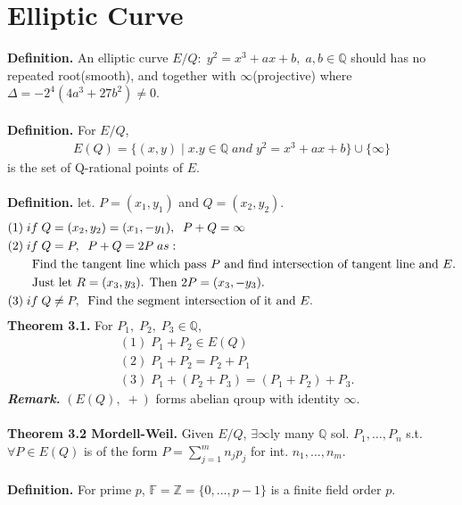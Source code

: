\documentclass[a4paper,10pt]{article}
\begin{document}
\section{Elliptic Curve}
\textbf{Definition.} An elliptic curve $E/Q: \; y^{2}=x^{3}+ax+b, \; a,b\in \mathbb{Q}$ should has no repeated root(smooth), and together with $\infty$(projective) where $\Delta=-2^{4}(4a^{3}+27b^{2})\neq 0$. \\ \\
\textbf{Definition.} For $E/Q$, 
\begin{align}
E(Q) = \{(x,y) \; | \; x.y \in \mathbb{Q} \; and \; y^{2}=x^{3}+ax+b\} \cup \{\infty\}
\end{align}
is the set of Q-rational points of $E$. \\ \\
\textbf{Definition.} let. $P=(x_{1}, y_{1})$ and $Q=(x_{2},y_{2})$.
\begin{align}
&(1) \; if \; Q=(x_{2},y_{2})=(x_{1},-y_{1}), \; \; P+Q=\infty \\
&(2) \; if \; Q=P, \; \; P+Q=2P \; as: \\
&\quad \quad \textnormal{Find the tangent line which pass $P$ and find intersection of tangent line and $E$.} \\ 
&\quad \quad \textnormal{Just let $R=(x_{3},y_{3})$. Then $2P=(x_{3},-y_{3})$.} \\
&(3) \; if \; Q\neq P, \; \; \textnormal{Find the segment intersection of it and $E$.}
\end{align}
\newpage
\textbf{Theorem 3.1.} For $P_{1}, \; P_{2}, \; P_{3} \in \mathbb{Q}$,
\begin{align}
&(1) \; P_{1}+P_{2}\in E(Q) \\
&(2) \; P_{1}+P_{2}=P_{2}+P_{1} \\
&(3) \; P_{1}+(P_{2}+P_{3})=(P_{1}+P_{2})+P_{3}.
\end{align}
\textit{\textbf{Remark.}} $(E(Q), \; +)$ forms abelian qroup with identity $\infty$. \\ \\
\textbf{Theorem 3.2 Mordell-Weil.} Given $E/Q$, $\exists \infty$ly many $\mathbb{Q}$ sol. $P_{1},\ldots ,P_{n}$ s.t. $\forall P\in E(Q)$ is of the form $P=\sum^{m}_{j=1}n_{j}p_{j}$ for int. $n_{1},\ldots , n_{m}$. \\ \\
\textbf{Definition.} For prime $p$, $\mathbb{F}=\mathbb{Z}=\{0,\ldots ,p-1\}$ is a finite field order $p$. \\ \\
\end{document}
